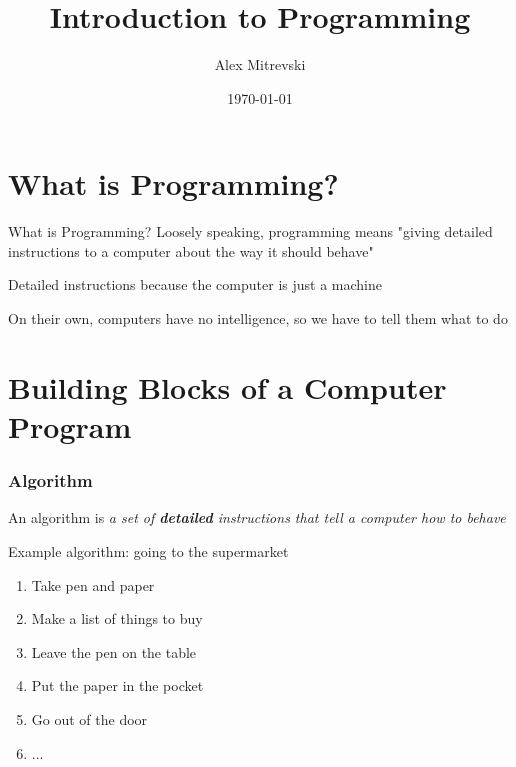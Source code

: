 \documentclass{beamer}
\author[Alex Mitrevski]{Alex Mitrevski}
\title{Introduction to Programming}
\subtitle{}
\institute[HBRS]{Hochschule Bonn-Rhein-Sieg}
\date{\today}
\begin{document}
{
\begin{frame}
\titlepage
\end{frame}
}

%

\section{What is Programming?}

\begin{frame}{What is Programming?}
    Loosely speaking, programming means "giving detailed instructions to a computer about the way it should behave"
    \newline

    Detailed instructions because the computer is just a machine
    \newline

    On their own, computers have no intelligence, so we have to tell them what to do
\end{frame}

\section{Building Blocks of a Computer Program}

\begin{frame}
\frametitle{Algorithm}
    An algorithm is \emph{a set of \textbf{detailed} instructions that tell a computer how to behave}
    \newline

    Example algorithm: going to the supermarket
    \begin{enumerate}
        \item Take pen and paper
        \item Make a list of things to buy
        \item Leave the pen on the table
        \item Put the paper in the pocket
        \item Go out of the door
        \item ...
    \end{enumerate}
\end{frame}
\end{document}
